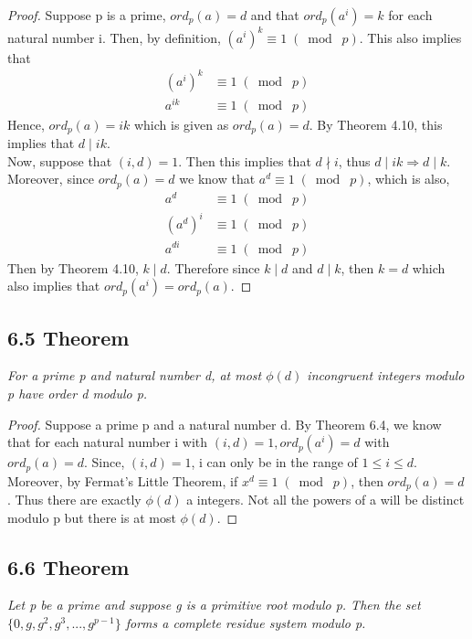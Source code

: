 \documentclass{article}
\begin{document}
\begin{proof}
Suppose p is a prime, $ord_p(a) = d$ and that $ord_p(a^i) = k$ for each natural number i. Then, by definition, $(a^i)^k \equiv 1 \;(\bmod\; p)$. This also implies that
\begin{align*}
    && (a^i)^k &\equiv 1 \;(\bmod\; p)&&\\
    && a^{ik} &\equiv 1 \;(\bmod\; p)&&
\end{align*}
Hence, $ord_p(a) = ik$ which is given as $ord_p(a) = d$. By Theorem 4.10, this implies that $d \mid ik$.\\
Now, suppose that $(i, d) = 1$. Then this implies that $d \nmid i$, thus $d \mid ik \Longrightarrow d \mid k$.\\
Moreover, since $ord_p(a) = d$ we know that $a^d \equiv 1 \;(\bmod\; p)$, which is also,
\begin{align*}
    && a^d &\equiv 1 \;(\bmod\; p)&&\\
    && (a^d)^i &\equiv 1 \;(\bmod\; p)&&\\
    && a^{di} &\equiv 1 \;(\bmod\; p)&&
\end{align*}
Then by Theorem 4.10, $k\mid d$. Therefore since $k\mid d$ and $d\mid k$, then $k = d$ which also implies that $ord_p(a^i) = ord_p(a)$.
\end{proof}

\subsection*{6.5 Theorem} 
\quad \textit{For a prime p and natural number d, at most $\phi(d)$ incongruent integers modulo p have order d modulo p.}

\begin{proof}
Suppose a prime p and a natural number d. By Theorem 6.4, we know that for each natural number i with $(i, d) = 1, ord_p(a^i) = d$ with $ord_p(a) = d$. Since, $(i, d) = 1$, i can only be in the range of $1 \leq i \leq d$. Moreover, by Fermat's Little Theorem, if $x^d \equiv 1 \;(\bmod\; p)$, then $ord_p(a) = d$. Thus there are exactly $\phi(d)$ a integers. Not all the powers of a will be distinct modulo p but there is at most $\phi(d)$.
\end{proof}

\subsection*{6.6 Theorem} 
\quad \textit{Let p be a prime and suppose g is a primitive root modulo p. Then the set $\{0, g, g^2, g^3,...,g^{p-1}\}$ forms a complete residue system modulo p.}
\end{document}
